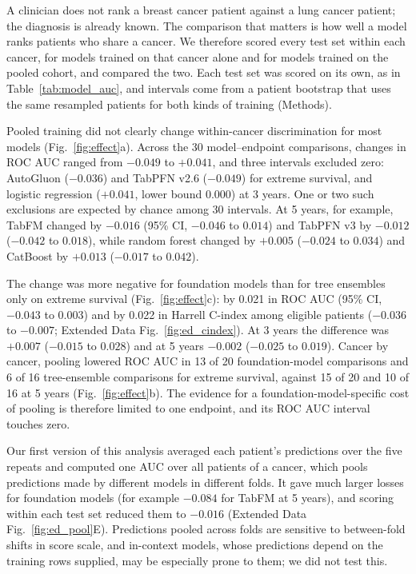 \documentclass[pdflatex,sn-nature]{sn-jnl}
\begin{document}
A clinician does not rank a breast cancer patient against a lung cancer patient; the diagnosis is already known. The comparison that matters is how well a model ranks patients who share a cancer. We therefore scored every test set within each cancer, for models trained on that cancer alone and for models trained on the pooled cohort, and compared the two. Each test set was scored on its own, as in Table~\ref{tab:model_auc}, and intervals come from a patient bootstrap that uses the same resampled patients for both kinds of training (Methods).

Pooled training did not clearly change within-cancer discrimination for most models (Fig.~\ref{fig:effect}a). Across the 30 model--endpoint comparisons, changes in ROC AUC ranged from $-0.049$ to $+0.041$, and three intervals excluded zero: AutoGluon ($-0.036$) and TabPFN v2.6 ($-0.049$) for extreme survival, and logistic regression ($+0.041$, lower bound 0.000) at 3 years. One or two such exclusions are expected by chance among 30 intervals. At 5 years, for example, TabFM changed by $-0.016$ (95\% CI, $-0.046$ to $0.014$) and TabPFN v3 by $-0.012$ ($-0.042$ to $0.018$), while random forest changed by $+0.005$ ($-0.024$ to $0.034$) and CatBoost by $+0.013$ ($-0.017$ to $0.042$).

The change was more negative for foundation models than for tree ensembles only on extreme survival (Fig.~\ref{fig:effect}c): by 0.021 in ROC AUC (95\% CI, $-0.043$ to $0.003$) and by 0.022 in Harrell C-index among eligible patients ($-0.036$ to $-0.007$; Extended Data Fig.~\ref{fig:ed_cindex}). At 3 years the difference was $+0.007$ ($-0.015$ to $0.028$) and at 5 years $-0.002$ ($-0.025$ to $0.019$). Cancer by cancer, pooling lowered ROC AUC in 13 of 20 foundation-model comparisons and 6 of 16 tree-ensemble comparisons for extreme survival, against 15 of 20 and 10 of 16 at 5 years (Fig.~\ref{fig:effect}b). The evidence for a foundation-model-specific cost of pooling is therefore limited to one endpoint, and its ROC AUC interval touches zero.

Our first version of this analysis averaged each patient's predictions over the five repeats and computed one AUC over all patients of a cancer, which pools predictions made by different models in different folds. It gave much larger losses for foundation models (for example $-0.084$ for TabFM at 5 years), and scoring within each test set reduced them to $-0.016$ (Extended Data Fig.~\ref{fig:ed_pool}E). Predictions pooled across folds are sensitive to between-fold shifts in score scale, and in-context models, whose predictions depend on the training rows supplied, may be especially prone to them; we did not test this.
\end{document}
